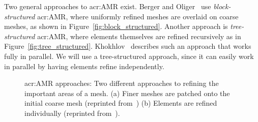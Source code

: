 Two general approaches to \acrshort{acr:AMR} exist. Berger and Oliger~\cite{Berger1984} use
\textit{block-structured} \acrshort{acr:AMR}, where uniformly refined meshes are overlaid on coarse
meshes, as shown in Figure~\ref{fig:block_structured}. Another approach is \textit{tree-structured}
\acrshort{acr:AMR}, where elements themselves are refined recursively as in
Figure~\ref{fig:tree_structured}. Khokhlov~\cite{Khokhlov1998} describes such an approach that works
fully in parallel. We will use a tree-structured approach, since it can easily work in parallel by
having elements refine independently.

\begin{figure}[H]
	\centering
	\hfill
	\caption{\Acrlong{acr:AMR} approaches: Two different approaches to refining the important areas of a mesh. (a) Finer meshes are patched onto the initial coarse mesh (reprinted from~\cite{Berger1984}) (b) Elements are refined individually (reprinted from~\cite{Khokhlov1998}).}\label{fig:amr_structures}
\end{figure}

